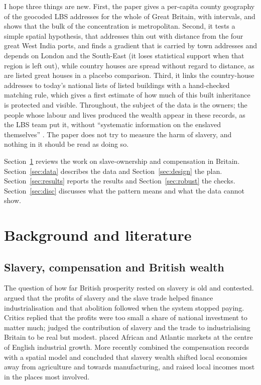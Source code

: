 \documentclass[11pt,a4paper]{article}
\begin{document}
I hope three things are new. First, the paper gives a per-capita county geography of the geocoded LBS addresses for the whole of Great Britain, with intervals, and shows that the bulk of the concentration is metropolitan. Second, it tests a simple spatial hypothesis, that addresses thin out with distance from the four great West India ports, and finds a gradient that is carried by town addresses and depends on London and the South-East (it loses statistical support when that region is left out), while country houses are spread without regard to distance, as are listed great houses in a placebo comparison. Third, it links the country-house addresses to today's national lists of listed buildings with a hand-checked matching rule, which gives a first estimate of how much of this built inheritance is protected and visible. Throughout, the subject of the data is the owners; the people whose labour and lives produced the wealth appear in these records, as the LBS team put it, without ``systematic information on the enslaved themselves'' \citep{lbs2026details}. The paper does not try to measure the harm of slavery, and nothing in it should be read as doing so.

Section~\ref{sec:lit} reviews the work on slave-ownership and compensation in Britain. Section~\ref{sec:data} describes the data and Section~\ref{sec:design} the plan. Section~\ref{sec:results} reports the results and Section~\ref{sec:robust} the checks. Section~\ref{sec:disc} discusses what the pattern means and what the data cannot show.

\section{Background and literature}\label{sec:lit}
\subsection{Slavery, compensation and British wealth}
The question of how far British prosperity rested on slavery is old and contested. \citet{williams1944} argued that the profits of slavery and the slave trade helped finance industrialisation and that abolition followed when the system stopped paying. Critics replied that the profits were too small a share of national investment to matter much; \citet{eltis2000} judged the contribution of slavery and the trade to industrialising Britain to be real but modest. \citet{inikori2002} placed African and Atlantic markets at the centre of English industrial growth. More recently \citet{heblich2022} combined the compensation records with a spatial model and concluded that slavery wealth shifted local economies away from agriculture and towards manufacturing, and raised local incomes most in the places most involved.
\end{document}
